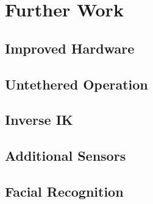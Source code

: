 \chapter{Further Work}


\section{Improved Hardware}
\section{Untethered Operation}
\section{Inverse IK}
\section{Additional Sensors}
\section{Facial Recognition}